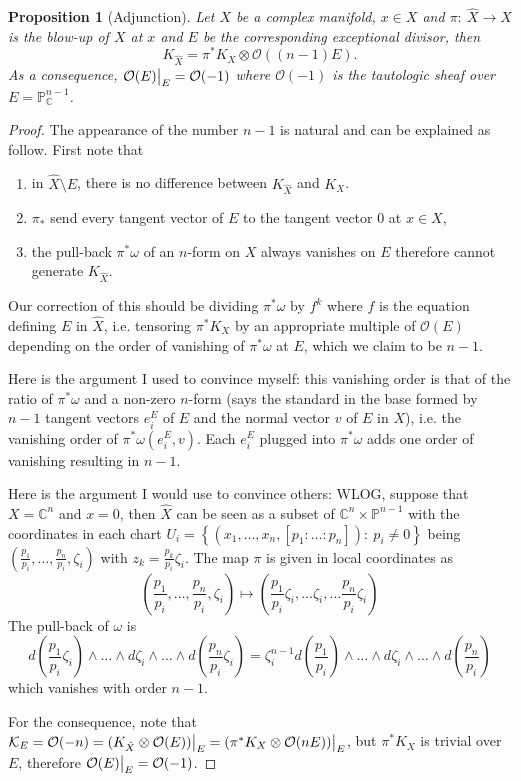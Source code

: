 \documentclass[11pt]{article}
\newtheorem{proposition}{Proposition}[theorem]
\newcommand\restr[2]{{%
\left.\kern-\nulldelimiterspace %
#1 %
\vphantom{\big|} %
\right|_{#2} %
}}
\begin{document}
\begin{proposition}[Adjunction]
\label{prop:adjunction}
Let \(X\) be a complex manifold, \(x\in X\) and \(\pi:\ \hat X \longrightarrow X\) is the blow-up of \(X\)
at \(x\) and \(E\) be the corresponding exceptional divisor, then
\[
K_{\hat X} = \pi^* K_X \otimes \mathcal{O}((n-1)E).
\]
As a consequence, \(\restr{\mathcal{O}(E)}{E} = \mathcal{O}(-1)\) where \(\mathcal{O}(-1)\) is the tautologic sheaf over \(E = \mathbb{P}^{n-1}_{\mathbb{C}}\).
\end{proposition}
\begin{proof}
The appearance of the number \(n-1\) is natural and can be explained as follow. First
note that 

\begin{enumerate}
\item in \(\hat X\setminus E\), there is no difference between \(K_{\hat X}\) and \(K_X\).
\item \(\pi_*\) send every tangent vector of \(E\) to the tangent
vector \(0\) at \(x\in X\),
\item the pull-back \(\pi^* \omega\)  of an \(n\)-form on \(X\) always vanishes on \(E\) therefore cannot generate \(K_{\hat X}\).
\end{enumerate}

Our correction of this should be dividing \(\pi^* \omega\) by \(f^k\) where \(f\) is
the equation defining \(E\) in \(\hat X\), i.e. tensoring \(\pi^* K_X\) by an
appropriate multiple of \(\mathcal{O}(E)\) depending on the order of vanishing of \(\pi^* \omega\) at \(E\), which we claim to be \(n-1\). 

Here is the argument I used to convince myself: this vanishing order is that of the
ratio of \(\pi^* \omega\) and a non-zero \(n\)-form (says the standard in the base
formed by \(n-1\) tangent vectors \(e^E_i\) of \(E\) and the normal vector \(v\)
of \(E\) in \(X\)), i.e. the vanishing order of \(\pi^*\omega(e^E_i, v)\). Each \(e^E_i\) plugged
into \(\pi^*\omega\) adds one order of vanishing resulting in \(n-1\).

Here is the argument I would use to convince others: WLOG, suppose that \(X =
\mathbb{C}^n\) and \(x=0\), then \(\hat X\) can be seen as a subset of \(\mathbb{C}^n\times \mathbb{P}^{n-1}\) with the coordinates in each chart \(U_i =
\left\{(x_1, \dots, x_n,[p_1:\dots:p_n]):\ p_i\ne 0\right\}\) being \((\frac{p_1}{p_i},\dots,\frac{p_n}{p_i},\zeta_i)\) with \(z_k = \frac{p_k}{p_i}\zeta_i\). The map \(\pi\) is given in local coordinates as
\[
(\frac{p_1}{p_i},\dots,\frac{p_n}{p_i},\zeta_i) \mapsto (\frac{p_1}{p_i}\zeta_i, \dots
\zeta_i, \dots \frac{p_n}{p_i}\zeta_i)
\]
The pull-back of \(\omega\) is
\[
d(\frac{p_1}{p_i}\zeta_i)\wedge\dots\wedge d\zeta_i \wedge \dots\wedge d(\frac{p_n}{p_i}\zeta_i) =
\zeta_i^{n-1}d(\frac{p_1}{p_i})\wedge\dots\wedge d\zeta_i\wedge\dots\wedge d(\frac{p_n}{p_i})
\]
which vanishes with order \(n-1\).

For the consequence, note that \(\mathcal{K}_E = \mathcal{O}(-n) = \restr{(K_{\hat X}\otimes
\mathcal{O}(E))}{E} = \restr{(\pi^* K_{X}\otimes
\mathcal{O}(nE))}{E}\), but \(\pi^* K_X\) is trivial over \(E\), therefore \(\restr{\mathcal{O}(E)}{E} = \mathcal{O}(-1)\).
\end{proof}
\end{document}
